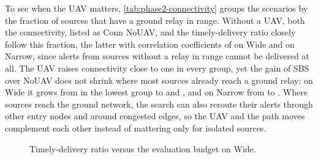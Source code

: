 To see when the UAV matters, \cref{tab:phase2-connectivity} groups the scenarios by the fraction of sources that have a ground relay in range. Without a UAV, both the connectivity, listed as Conn NoUAV, and the timely-delivery ratio closely follow this fraction, the latter with correlation coefficients of \ResultTwoGroundCorrelationVzero{} on Wide and \ResultTwoGroundCorrelationVzeroBhfivezero{} on Narrow, since alerts from sources without a relay in range cannot be delivered at all. The UAV raises connectivity close to one in every group, yet the gain of SBS over NoUAV does not shrink where most sources already reach a ground relay: on Wide it grows from \ResultTwoTercileGainVzeroLow{} in the lowest group to \ResultTwoTercileGainVzeroMiddle{} and \ResultTwoTercileGainVzeroHigh{}, and on Narrow from \ResultTwoTercileGainVzeroBhfivezeroLow{} to \ResultTwoTercileGainVzeroBhfivezeroHigh. Where sources reach the ground network, the search can also reroute their alerts through other entry nodes and around congested edges, so the UAV and the path moves complement each other instead of mattering only for isolated sources.

\label{sec:results-budget}
\begin{figure}[htbp]
\centering
{}
\caption{Timely-delivery ratio versus the evaluation budget on Wide.}
\label{fig:budget}
\end{figure}

